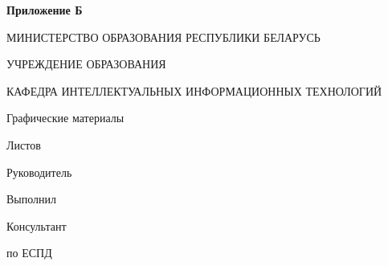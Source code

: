 \begin{flushright}
    \textbf{Приложение Б}
\end{flushright}
\begin{center}
    МИНИСТЕРСТВО ОБРАЗОВАНИЯ РЕСПУБЛИКИ БЕЛАРУСЬ

    УЧРЕЖДЕНИЕ ОБРАЗОВАНИЯ

    КАФЕДРА ИНТЕЛЛЕКТУАЛЬНЫХ ИНФОРМАЦИОННЫХ ТЕХНОЛОГИЙ
\end{center}

\vfill

\begin{center}
    \TitlePageTopic
\end{center}

\vfill

\begin{center}
    Графические материалы
\end{center}

\vfill

\begin{center}
    \graphicalAttachmentSignature
\end{center}

\vfill


\begin{center}
    Листов~\pageref{LastPage}
\end{center}

\vfill

\begin{flushright}
    \begin{minipage}[t]{7cm}
        Руководитель

        \vspace{4mm}

        Выполнил

        \vspace{4mm}

        Консультант

        по ЕСПД
    \end{minipage}
    \begin{minipage}[t]{7cm}
        \titlePageTeacherSurname~\titlePageTeacherName

        \vspace{4mm}

        \titlePageStudentSurname~\titlePageStudentName

        \vspace{4mm}

        \titlePageTeacherSurname~\titlePageTeacherName
    \end{minipage}
\end{flushright}

\vfill

\begin{center}
    \titlePageCity~\ESKDtheYear
\end{center}



